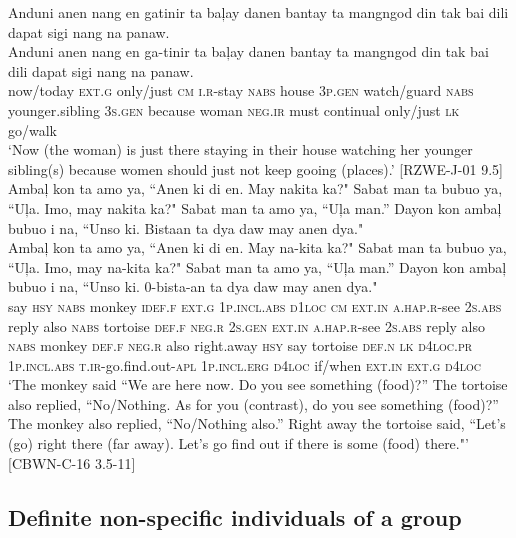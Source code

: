 \ea
Anduni anen nang en gatinir ta baļay danen bantay ta mangngod din tak bai dili dapat sigi nang na panaw. \\\smallskip \gll Anduni  anen  nang  en  ga-tinir  ta  baļay  danen  bantay  ta mangngod  din  tak  bai  dili  dapat  sigi  nang  na  panaw. \\
now/today  \textsc{ext.g}  only/just  \textsc{cm}  \textsc{i.r}-stay  \textsc{nabs}  house  3\textsc{p.gen}  watch/guard  \textsc{nabs}
younger.sibling  3\textsc{s.gen}  because  woman  \textsc{neg.ir}  must  continual  only/just  \textsc{lk}  go/walk \\
\glt ‘Now (the woman) is just there staying in their house watching her younger sibling(s) because women should just not keep gooing (places).’ [RZWE-J-01 9.5]
\z
\ea
Ambaļ kon ta amo ya, ``Anen ki di en. May nakita ka?" Sabat man ta bubuo ya, ``Uļa. Imo, may nakita ka?" Sabat man ta amo ya, “Uļa man.” Dayon kon ambaļ bubuo i na, ``Unso ki. Bistaan ta dya daw may anen dya." \\\smallskip \gll Ambaļ  kon  ta  amo  ya,   ``Anen  ki  di  en.   May  na-kita ka?"  Sabat  man  ta  bubuo  ya,  ``Uļa.  Imo,  may  na-kita  ka?" Sabat  man  ta  amo  ya,  “Uļa  man.”  Dayon  kon  ambaļ  bubuo  i    na, ``Unso  ki.  0-bista-an  ta  dya  daw  may  anen  dya." \\
say  \textsc{hsy}  \textsc{nabs}  monkey  \textsc{idef.f}  \textsc{ext.g}  1\textsc{p.incl.abs}  \textsc{d}1\textsc{loc}  \textsc{cm}  \textsc{ext.in}  \textsc{a.hap.r}-see
2\textsc{s.abs}  reply  also  \textsc{nabs}  tortoise  \textsc{def.f}  \textsc{neg.r}  2\textsc{s.gen}  \textsc{ext.in}  \textsc{a.hap.r}-see  2\textsc{s.abs}
reply  also  \textsc{nabs}  monkey  \textsc{def.f}  \textsc{neg.r}  also  right.away  \textsc{hsy}  say  tortoise  \textsc{def.n}  \textsc{lk}
\textsc{d}4\textsc{loc.pr}  1\textsc{p.incl.abs}  \textsc{t.ir}-go.find.out-\textsc{apl}  1\textsc{p.incl.erg}  \textsc{d}4\textsc{loc}  if/when  \textsc{ext.in}  \textsc{ext.g}
\textsc{d}4\textsc{loc} \\
\glt ‘The monkey said “We are here now. Do you see something (food)?”  The tortoise also replied, “No/Nothing. As for you (contrast), do you see something (food)?” The monkey also replied, “No/Nothing also.” Right away the tortoise said, “Let’s (go) right there (far away). Let’s go find out if there is some (food) there."’ [CBWN-C-16 3.5-11]
\z


\subsection{Definite non-specific individuals of a group}

